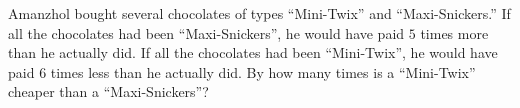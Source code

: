 Amanzhol bought several chocolates of types ``Mini-Twix'' and ``Maxi-Snickers.'' If all the chocolates had been ``Maxi-Snickers'', he would have paid $5$ times more than he actually did. If all the chocolates had been ``Mini-Twix'', he would have paid $6$ times less than he actually did. By how many times is a ``Mini-Twix'' cheaper than a ``Maxi-Snickers''?
